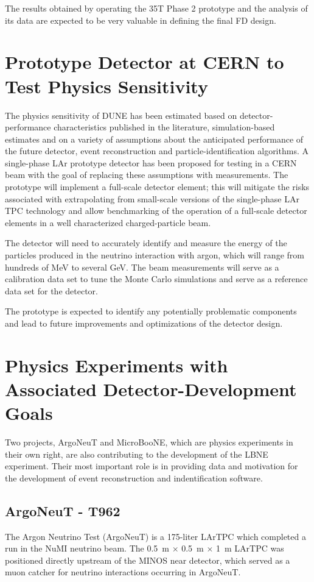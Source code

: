 The results obtained by operating the 35T Phase 2 prototype and the analysis of its data are expected
to be very valuable in defining the final FD design. 


\section{Prototype Detector at CERN to Test Physics Sensitivity}

The physics sensitivity of DUNE has been estimated based on detector-performance characteristics published in the literature, simulation-based estimates
and on a variety of assumptions about the anticipated performance of the future detector, event reconstruction and particle-identification algorithms.
A single-phase LAr prototype detector has been proposed for testing in a CERN beam with the goal of
 replacing these assumptions with measurements.  The prototype will implement a full-scale detector element; this will 
 mitigate the risks associated with extrapolating from small-scale versions of the single-phase LAr TPC technology and allow benchmarking of the operation of a full-scale detector elements in a well characterized charged-particle beam.  

The detector will need to accurately identify and measure the energy of the particles produced in the neutrino interaction with argon, which will range from hundreds of MeV to several GeV.
The beam measurements will serve as a calibration data set to tune the Monte Carlo simulations and serve as a reference data set for the detector. 

The prototype is expected to identify any potentially problematic components and lead to future improvements and optimizations of the detector design.



\section{Physics Experiments with Associated Detector-Development Goals}

Two projects, ArgoNeuT and MicroBooNE,  which are physics experiments in their own right, are also contributing to the development of the LBNE experiment. Their most important role is in providing data and motivation for the development of event reconstruction and indentification software.

\subsection{ArgoNeuT - T962}
The Argon Neutrino Test (ArgoNeuT) is a 175-liter LArTPC which completed a run in the NuMI neutrino beam.  The 0.5~m $\times$ 0.5~m $\times$ 1~m LArTPC was positioned directly upstream of the MINOS near detector, which served as a muon catcher for neutrino interactions occurring in ArgoNeuT. 

